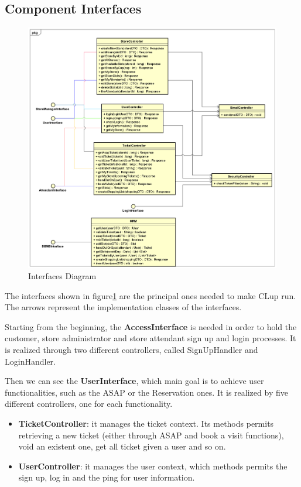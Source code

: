 \documentclass[table, 12pt]{article}
\begin{document}
\subsection{Component Interfaces}
\begin{figure}[H]
    \begin{center}
        \includegraphics[scale=0.35]{assets/Interfaces/InterfacesDiagramUpdated.png}
        \caption{Interfaces Diagram}\label{interfaces_diagram}
    \end{center}
\end{figure}

The interfaces shown in figure\ref{interfaces_diagram} are the principal ones needed to make CLup run. The arrows represent the implementation classes of the interfaces.

Starting from the beginning, the \textbf{AccessInterface} is needed in order to hold the customer, store administrator and store attendant sign up and login processes. It is realized through two different controllers, called SignUpHandler and LoginHandler.

Then we can see the \textbf{UserInterface}, which main goal is to achieve user functionalities, such as the ASAP or the Reservation ones. It is realized by five different controllers, one for each functionality.
\begin{itemize}
    \item \textbf{TicketController}: it manages the ticket context. Its methods permits retrieving a new ticket (either through ASAP and book a visit functions), void an existent one, get all ticket given a user and so on.
    \item \textbf{UserController}: it manages the user context, which methods permits the sign up, log in and the ping for user information.
\end{itemize}
\end{document}
